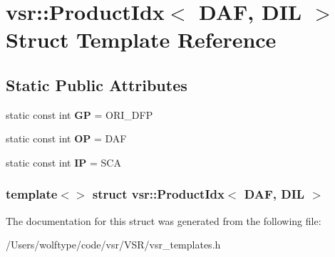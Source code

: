 \hypertarget{structvsr_1_1_product_idx_3_01_d_a_f_00_01_d_i_l_01_4}{\section{vsr\-:\-:Product\-Idx$<$ D\-A\-F, D\-I\-L $>$ Struct Template Reference}
\label{structvsr_1_1_product_idx_3_01_d_a_f_00_01_d_i_l_01_4}
}
\subsection*{Static Public Attributes}
\begin{DoxyCompactItemize}
\item 
\hypertarget{structvsr_1_1_product_idx_3_01_d_a_f_00_01_d_i_l_01_4_a270b91c4d99a5be2ea5ddc4979e71c6f}{static const int {\bfseries G\-P} = O\-R\-I\-\_\-\-D\-F\-P}\label{structvsr_1_1_product_idx_3_01_d_a_f_00_01_d_i_l_01_4_a270b91c4d99a5be2ea5ddc4979e71c6f}

\item 
\hypertarget{structvsr_1_1_product_idx_3_01_d_a_f_00_01_d_i_l_01_4_a361c65a6b54c1f7fe3854f126e79d4bd}{static const int {\bfseries O\-P} = D\-A\-F}\label{structvsr_1_1_product_idx_3_01_d_a_f_00_01_d_i_l_01_4_a361c65a6b54c1f7fe3854f126e79d4bd}

\item 
\hypertarget{structvsr_1_1_product_idx_3_01_d_a_f_00_01_d_i_l_01_4_adeed025a6fe3d4405d1c61f730171e88}{static const int {\bfseries I\-P} = S\-C\-A}\label{structvsr_1_1_product_idx_3_01_d_a_f_00_01_d_i_l_01_4_adeed025a6fe3d4405d1c61f730171e88}

\end{DoxyCompactItemize}
\subsubsection*{template$<$$>$ struct vsr\-::\-Product\-Idx$<$ D\-A\-F, D\-I\-L $>$}



The documentation for this struct was generated from the following file\-:\begin{DoxyCompactItemize}
\item 
/\-Users/wolftype/code/vsr/\-V\-S\-R/vsr\-\_\-templates.\-h\end{DoxyCompactItemize}
